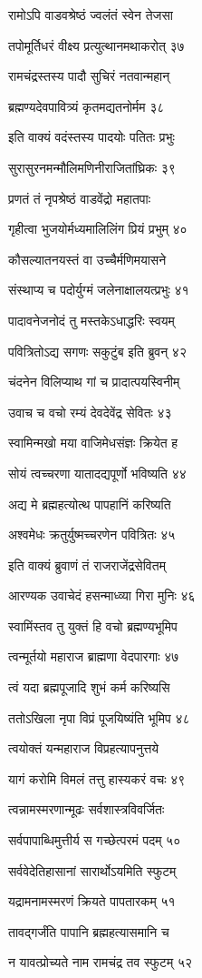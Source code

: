 रामोऽपि वाडवश्रेष्ठं ज्वलंतं स्वेन तेजसा

तपोमूर्तिधरं वीक्ष्य प्रत्युत्थानमथाकरोत् ३७

रामचंद्रस्तस्य पादौ सुचिरं नतवान्महान्

ब्रह्मण्यदेवपावित्र्यं कृतमद्यतनोर्मम ३८

इति वाक्यं वदंस्तस्य पादयोः पतितः प्रभुः

सुरासुरनमन्मौलिमणिनीराजितांघ्रिकः ३९

प्रणतं तं नृपश्रेष्ठं वाडवेंद्रो महातपाः

गृहीत्वा भुजयोर्मध्यमालिलिंग प्रियं प्रभुम् ४०

कौसल्यातनयस्तं वा उच्चैर्मणिमयासने

संस्थाप्य च पदोर्युग्मं जलेनाक्षालयत्प्रभुः ४१

पादावनेजनोदं तु मस्तकेऽधाद्धरिः स्वयम्

पवित्रितोऽद्य सगणः सकुटुंब इति ब्रुवन् ४२

चंदनेन विलिप्याथ गां च प्रादात्पयस्विनीम्

उवाच च वचो रम्यं देवदेवेंद्र सेवितः ४३

स्वामिन्मखो मया वाजिमेधसंज्ञः क्रियेत ह

सोयं त्वच्चरणा यातादद्यपूर्णो भविष्यति ४४

अद्य मे ब्रह्महत्योत्थ पापहानिं करिष्यति

अश्वमेधः क्रतुर्युष्मच्चरणेन पवित्रितः ४५

इति वाक्यं ब्रुवाणं तं राजराजेंद्रसेवितम्

आरण्यक उवाचेदं हसन्माध्व्या गिरा मुनिः ४६

स्वामिंस्तव तु युक्तं हि वचो ब्रह्मण्यभूमिप

त्वन्मूर्तयो महाराज ब्राह्मणा वेदपारगाः ४७

त्वं यदा ब्रह्मपूजादि शुभं कर्म करिष्यसि

ततोऽखिला नृपा विप्रं पूजयिष्यंति भूमिप ४८

त्वयोक्तं यन्महाराज विप्रहत्यापनुत्तये

यागं करोमि विमलं तत्तु हास्यकरं वचः ४९

त्वन्नामस्मरणान्मूढः सर्वशास्त्रविवर्जितः

सर्वपापाब्धिमुत्तीर्य स गच्छेत्परमं पदम् ५०

सर्ववेदेतिहासानां सारार्थोऽयमिति स्फुटम्

यद्रामनामस्मरणं क्रियते पापतारकम् ५१

तावद्गर्जंति पापानि ब्रह्महत्यासमानि च

न यावत्प्रोच्यते नाम रामचंद्र तव स्फुटम् ५२

